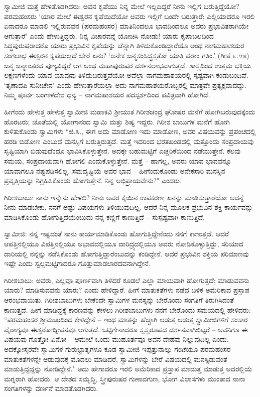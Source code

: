 ಸ್ವಾಮೀಜಿ ಮತ್ತೆ ಹೇಳತೊಡಗಿದರು: ಅವನ ಕೃಪೆಯು ನಿನ್ನ ಮೇಲೆ ಇಲ್ಲದಿದ್ದರೆ ನೀನು ಇಲ್ಲಿಗೆ ಬರುತ್ತಿದ್ದೆಯೋ? ಪರಮಹಂಸರು ‘ಯಾರ ಮೇಲೆ ಈಶ್ವರನ ಕೃಪೆಯಿದೆಯೋ ಅವರು ಇಲ್ಲಿಗೆ ಬಂದೇ ಬರುತ್ತಾರೆ; ಎಲ್ಲಿಯಾದರೂ ಇರಲಿ ಏನಾದರೂ ಮಾಡಲಿ ಇಲ್ಲಿರುವವನ (ಪರಮಹಂಸರ) ಮಾತಿನಿಂದಲೂ ಭಾವದಿಂದಲೂ ಅವರು ಪ್ರಭಾವಿತರಾಗಿಯೇ ಆಗುತ್ತಾರೆ’ ಎಂದು ಹೇಳುತ್ತಿದ್ದರು. ನಿನ್ನ ವಿಚಾರವನ್ನೆ ಯೋಚಿಸಿ ನೋಡು! ಯಾರು ಕೃಪಾಬಲದಿಂದ ಸಿದ್ಧಪುರುಷರಾದರೊ ಯಾರು ಪ್ರಭುವಿನ ಕೃಪೆಯನ್ನು ಚೆನ್ನಾಗಿ ತಿಳಿದುಕೊಂಡಿದ್ದಾರೆಯೊ ಅಂಥ ನಾಗಮಹಾಶಯರ ಸಂಗಲಾಭ ಈಶ್ವರನ ಕೃಪೆಯಲ್ಲದೆ ಬೇರೆ ಏನು? ‘ಅನೇಕ ಜನ್ಮಸಂಸಿದ್ಧಸ್ತತೋ ಯಾತಿ ಪರಾಂ ಗತಿಂ.’ (ಗೀತೆ ೬.೪೫) ಜನ್ಮ ಜನ್ಮಾಂತರದ ಪುಣ್ಯವಿದ್ದರೆ ಆಗ ಅಂಥ ಮಹಾಪುರುಷರ ದರ್ಶನಲಾಭವಾಗುತ್ತದೆ. ಶಾಸ್ತ್ರದಿಂದ ಉತ್ತಮ ಭಕ್ತಿಯ ಲಕ್ಷಣಗಳೆಂದು ಯಾವ ಯಾವುವು ತಿಳಿದುಬರುತ್ತವೆಯೋ ಅವೆಲ್ಲಾ ನಾಗಮಹಾಶಯರಲ್ಲಿ ಸ್ಪಷ್ಟವಾಗಿ ಕಂಡುಬಂದಿವೆ. ‘ತೃಣಾದಪಿ ಸುನೀಚೇನ’ ಎಂದು ಹೇಳುತ್ತಾರೆಯಲ್ಲಾ ಅದು ನಾಗಮಹಾಶಯರೊಬ್ಬರಲ್ಲಿ ಮಾತ್ರವೇ ಪ್ರತ್ಯಕ್ಷವಾದದ್ದು. ನಿಮ್ಮ ಪೂರ್ವ ಬಂಗಾಳದೇಶ ಧನ್ಯ – ನಾಗಮಹಾಶಯರ ಪದಸ್ಪರ್ಶದಿಂದ ಪವಿತ್ರವಾಗಿ ಹೋಗಿದೆ.

ಹೀಗೆಂದು ಹೇಳುತ್ತ ಹೇಳುತ್ತ ಸ್ವಾಮೀಜಿ ಮಹಾಕವಿ ಶ‍್ರೀಯುತ ಗಿರೀಶಚಂದ್ರ ಘೋಷರ ಮನೆಗೆ ಹೋಗಿಬರುವುದಕ್ಕೆಂದು ಹೊರಟರು; ಜೊತೆಯಲ್ಲಿ ಯೋಗಾನಂದ ಸ್ವಾಮಿ ಮತ್ತು ಶಿಷ್ಯ ಇದ್ದರು. ಗಿರೀಶ ಬಾಬುಗಳ ಮನೆಗೆ ಹೋಗಿ ಕುಳಿತುಕೊಂಡು ಸ್ವಾಮಿಗಳು “ಜಿ.ಸಿ., ಈಗ ಅದು ಮಾಡೋಣ ಇದು ಮಾಡೋಣ, ಅವರ ವಿಷಯವನ್ನು ಪ್ರಪಂಚದಲ್ಲಿ ಹರಡಿ ಬಿಡೋಣ ಎಂಬುದೆ ಮನಸ್ಸಿಗೆ ಬರುತ್ತಿರುತ್ತದೆ. ಮತ್ತೆ ಇದರಿಂದ ಭರತಖಂಡದಲ್ಲಿ ಮತ್ತೊಂದು ಸಂಪ್ರದಾಯವು ಸೃಷ್ಟಿಯಾಗಿ ಬಿಡುವುದೆಂದೂ ಭಾವಿಸಿಕೊಳ್ಳುತ್ತೇನೆ. ಅದಕ್ಕೇ ಬಹುಮಟ್ಟಿಗೆ ಎಚ್ಚರಿಕೆಯಿಂದ ನಡೆಯುತ್ತೇನೆ. ಕೆಲವು ಸಮಯ, ಸಂಪ್ರದಾಯವಾಗಿ ಹೋಗಲಿ ಎಂದುಕೊಳ್ಳುತ್ತೇನೆ. ಮತ್ತೆ – ಹಾಗಲ್ಲ, ಅವರು ಯಾವ ಭಾವವನ್ನೂ ಯಾವಾಗಲೂ ನಷ್ಟಪಡಿಸಲಿಲ್ಲ. ಸಮದೃಷ್ಟಿಯೆ ಅವರ ಭಾವ – ಹೀಗೆಂದುಕೊಂಡು ಅನೇಕಸಾರಿ ಮನಸ್ಸಿನ ಪ್ರವೃತ್ತಿಯನ್ನು ನಿಗ್ರಹಿಸಿಕೊಂಡು ಹೋಗುತ್ತೇನೆ. ನಿನ್ನ ಅಭಿಪ್ರಾಯವೇನು?" ಎಂದರು.

ಗಿರೀಶಬಾಬು: ನಾನು ಇನ್ನೇನು ಹೇಳಲಿ? ನೀನು ಅವರ ಕೈಯಿನ ಉಪಕರಣ; ಏನನ್ನು ಮಾಡಿಸುತ್ತಾರೆಯೋ ಅದನ್ನೆ ನೀನು ಮಾಡಬೇಕು. ನನಗೆ ಅಷ್ಟು ವಿಷಯಗಳು ತಿಳಿಯುವುದಿಲ್ಲ. ಆದರೆ ನಿನ್ನ ಮೂಲಕ ಪ್ರಭುವಿನ ಶಕ್ತಿ ಕಾರ್ಯವನ್ನು ಮಾಡಿಸಿಕೊಂಡು ಹೋಗುತ್ತಿದೆಯೆಂಬುದು ನನ್ನ ಕಣ್ಣಿಗೆ ಕಾಣುತ್ತಿದೆ – ಸುಸ್ಪಷ್ಟವಾಗಿ ಕಾಣುತ್ತಿದೆ.

ಸ್ವಾಮೀಜಿ: ನನ್ನ ಇಷ್ಟದಂತೆ ನಾನು ಕಾರ್ಯಮಾಡಿಕೊಂಡು ಹೋಗುತ್ತಿದ್ದೇನೆಂದು ನನಗೆ ಕಾಣುತ್ತದೆ. ಆದರೆ ಆಪತ್ತಿನಲ್ಲಿಯೂ ವಿಪತ್ತಿನಲ್ಲಿಯೂ ಅಭಾವದಲ್ಲಿಯೂ ದಾರಿದ್ರ್ಯದಲ್ಲಿಯೂ ಅವರು ನೋಡಿಕೊಳ್ಳುತ್ತಿದ್ದು, ಸರಿಯಾದ ದಾರಿಯಲ್ಲಿ ನನ್ನನ್ನು ನಡೆಸಿಕೊಂಡು ಹೋಗುತ್ತಿದ್ದಾರೆಂಬುದನ್ನು ಕಂಡಿದ್ದೇನೆ. ಆದರೆ ಪ್ರಭುವಿನ ಶಕ್ತಿಯ ಪರಿಮಾಣವು ಇಷ್ಟೇ ಎಂದು ಸ್ವಲ್ಪಮಟ್ಟಿಗಾದರೂ ಗೊತ್ತುಮಾಡಲಾರದವನಾಗಿದ್ದೇನೆ.

ಗಿರೀಶಬಾಬು: ಅವರು, ಎಲ್ಲವೂ ಪೂರ್ಣವಾಗಿ ತಿಳಿದರೆ ಕೂಡಲೆ ಎಲ್ಲಾ ಮಾಯವಾಗಿ ಹೋಗುತ್ತದೆ; ಮಾಡುವವನು ಯಾರು? ಮಾಡಿಸುವವನು ಯಾರು? ಎಂದು ಹೇಳಿದ್ದಾರೆ. ಹೀಗೆ ಮಾತುಕತೆಗಳು ನಡೆದ ಬಳಿಕ ಅಮೆರಿಕಾದ ಪ್ರಸ್ತಾಪ ಆರಂಭವಾಯಿತು. ಗಿರೀಶಬಾಬುಗಳು ಬೇಕೆಂದೇ ಸ್ವಾಮಿಗಳ ಮನಸ್ಸನ್ನು ಬೇರೊಂದು ಸಂಗತಿಗೆ ತಿರುಗಿಸಿದಂತೆ ಕಾಣುತ್ತದೆ. ಹೀಗೆ ಮಾಡಿದ್ದಕ್ಕೆ ಕಾರಣವನ್ನು ಕೇಳಲು ಗಿರೀಶಬಾಬುಗಳು ನನಗೆ ಬೇರೊಂದು ಸಮಯದಲ್ಲಿ ಹೇಳಿದರು: “ಪರಮಹಂಸರ ಶ‍್ರೀಮುಖದಿಂದ ಕೇಳಿದ್ದೇನೆ – ಇಂಥ ಮಾತನ್ನು ಹೆಚ್ಚಾಗಿ ಆಡುತ್ತ ಆಡುತ್ತ ಸ್ವಾಮೀಜಿಗಳಿಗೆ ಸಂಸಾರ ವೈರಾಗ್ಯವೂ ಈಶ್ವರೋದ್ದೀಪನವೂ ಆಗುತ್ತದೆ. ಒಟ್ಟಿಗೇನಾದರೂ ಸ್ವಸ್ವರೂಪದ ದರ್ಶನವಾಗಿಬಿಟ್ಟರೆ – ಅವನಿಗೂ ಈ ವಿಷಯವು ಗೊತ್ತೋ ಏನೋ – ಆಮೇಲೆ ಒಂದು ಮುಹೂರ್ತವೂ ಅವನ ದೇಹವು ನಿಲ್ಲುವುದಿಲ್ಲ ಎಂದು. ಅದಕ್ಕೋಸ್ಕರವೇ ಸ್ವಾಮಿಗಳ ಗುರುಭ್ರಾತೃಗಳೂ ಕೂಡ ಸ್ವಾಮೀಜಿ ಇಪ್ಪತ್ತುನಾಲ್ಕು ಗಂಟೆಯೂ ಪರಮಹಂಸರ ಮಾತುಕತೆಗಳನ್ನೇ ಆಡುವುದಕ್ಕೆ ಮೊದಲು ಮಾಡಿದರೆ, ಸ್ವಾಮಿಗಳನ್ನು ಬೇರೆ ವಿಷಯದಲ್ಲಿ ಮನಸ್ಸಿಡುವಂತೆ ಮಾಡುತ್ತಿದ್ದದ್ದನ್ನು ನೋಡಿದ್ದೇನೆ." ಅದು ಹೇಗಾದರೂ ಇರಲಿ ಅಮೆರಿಕಾದ ಪ್ರಸ್ತಾಪ ಮಾಡುತ್ತ ಮಾಡುತ್ತ ಅದರಲ್ಲಿಯೆ ಮಗ್ನರಾಗಿ ಹೋದರು. ಆ ದೇಶದ ಸಮೃದ್ಧಿ, ಸ್ತ್ರೀಪುರುಷರ ಗುಣಾವಗುಣ, ಭೋಗ ವಿಲಾಸಗಳು ಮುಂತಾದ ನಾನಾ ಸಂಗತಿಗಳನ್ನು ವರ್ಣನೆ ಮಾಡತೊಡಗಿದರು.

